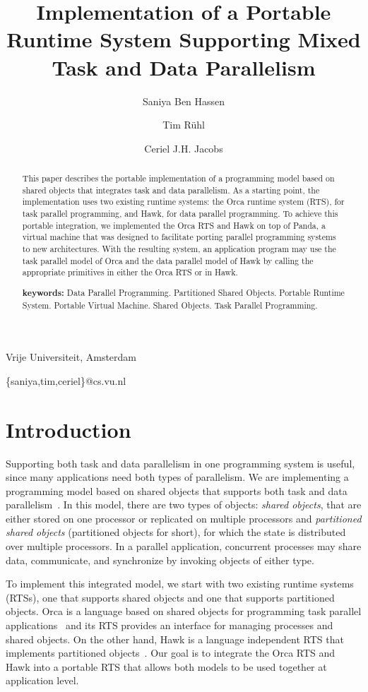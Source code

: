 \documentclass{article}
\title{Implementation of a Portable Runtime System Supporting Mixed
Task and Data Parallelism}
\author{Saniya Ben Hassen \and Tim R\"uhl \and Ceriel J.H. Jacobs}
\date{}
\begin{document}
\maketitle

\begin{center}
Vrije Universiteit, Amsterdam 

\{saniya,tim,ceriel\}@cs.vu.nl
\end{center}

\begin{abstract}
  This paper describes the portable implementation of a programming
  model based on shared objects that integrates task and data
  parallelism. As a starting point, the implementation uses two
  existing runtime systems: the Orca runtime system (RTS), for task
  parallel programming, and Hawk, for data parallel programming.  To
  achieve this portable integration, we implemented the Orca RTS and
  Hawk on top of Panda, a virtual machine that was designed to
  facilitate porting parallel programming systems to new
  architectures. With the resulting system, an application program may
  use the task parallel model of Orca and the data parallel model of
  Hawk by calling the appropriate primitives in either the Orca RTS or
  in Hawk.

  \vspace{0.5cm}
  \textbf{keywords:} Data Parallel Programming.  Partitioned Shared
  Objects. Portable Runtime System. Portable Virtual Machine. Shared
  Objects. Task Parallel Programming.
\end{abstract}


\section{Introduction}
\label{sec:intro}

Supporting both task and data parallelism in one programming system is
useful, since many applications need both types of parallelism. We are
implementing a programming model based on shared objects that supports
both task and data parallelism~\cite{ics96}. In this model, there are
two types of objects: \emph{shared objects}, that are either stored on
one processor or replicated on multiple processors and
\emph{partitioned shared objects} (partitioned objects for short), for
which the state is distributed over multiple processors. In a parallel
application, concurrent processes may share data, communicate, and
synchronize by invoking objects of either type.

To implement this integrated model, we start with two existing runtime
systems (RTSs), one that supports shared objects and one that supports
partitioned objects. Orca is a language based on shared objects for
programming task parallel applications~\cite{bal92} and its RTS
provides an interface for managing processes and shared objects. On
the other hand, Hawk is a language independent RTS that implements
partitioned objects~\cite{hicss96}. Our goal is to integrate the Orca
RTS and Hawk into a portable RTS that allows both models to be used
together at application level.
\end{document}

